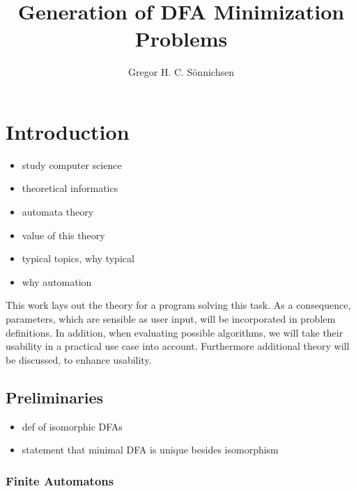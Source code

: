 \documentclass[a4paper, oneside, 11pt]{report}
\title{Generation of DFA Minimization Problems}
\author{Gregor H. C. Sönnichsen}
\theoremstyle{definition}
\theoremstyle{remark}
\begin{document}
\maketitle



\tableofcontents

\chapter{Introduction}

\begin{itemize}
	\item study computer science
	\item theoretical informatics
	\item automata theory
	\item value of this theory
	\item typical topics, why typical
	\item why automation
\end{itemize}

This work lays out the theory for a program solving this task. As a consequence, parameters, which are sensible as user input, will be incorporated in problem definitions.
In addition, when evaluating possible algorithms, we will take their usability in a practical use case into account.
Furthermore additional theory will be discussed, to enhance usability.

\section{Preliminaries}

\begin{itemize}
	\item def of isomorphic DFAs
	\item statement that minimal DFA is unique besides isomorphism
\end{itemize}

\subsection{Finite Automatons}
\end{document}
